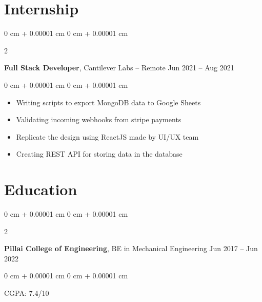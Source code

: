 \documentclass[10pt, letterpaper]{article}
\newenvironment{highlights}{
    \begin{itemize}[
        topsep=0.10 cm,
        parsep=0.10 cm,
        partopsep=0pt,
        itemsep=0pt,
        leftmargin=0 cm + 10pt
    ]
}{
    \end{itemize}
} %
\newenvironment{onecolentry}{
    \begin{adjustwidth}{
        0 cm + 0.00001 cm
    }{
        0 cm + 0.00001 cm
    }
}{
    \end{adjustwidth}
} %
\newenvironment{twocolentry}[2][]{
    \onecolentry
    \def\secondColumn{#2}
    \setcolumnwidth{\fill, 4.5 cm}
    \begin{paracol}{2}
}{
    \switchcolumn \raggedleft \secondColumn
    \end{paracol}
    \endonecolentry
} %
\begin{document}
        \vspace{0.2 cm}


    \section{Internship}



        
        \begin{twocolentry}{
            Jun 2021 – Aug 2021
        }
            \textbf{Full Stack Developer}, Cantilever Labs -- Remote\end{twocolentry}

        \vspace{0.10 cm}
        \begin{onecolentry}
            \begin{highlights}
                \item Writing scripts to export MongoDB data to Google Sheets
                \item Validating incoming webhooks from stripe payments
                \item Replicate the design using ReactJS made by UI/UX team 
                \item Creating REST API for storing data in the database
            \end{highlights}
        \end{onecolentry}


        \vspace{0.2 cm}

    \section{Education}



        
        \begin{twocolentry}{
            Jun 2017 – Jun 2022
        }
            \textbf{Pillai College of Engineering}, BE in Mechanical Engineering\end{twocolentry}

        \vspace{0.10 cm}
        \begin{onecolentry}

            CGPA: 7.4/10

        \end{onecolentry}
        \vspace{0.20 cm}
\end{document}
